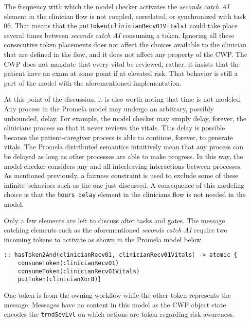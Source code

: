 The frequency with which the model checker activates the \emph{seconds catch AI} element in the clinician flow is not coupled, correlated, or synchronized with task 06. That means that the \texttt{putToken(clinicianRecv01Vitals)} could take place several times between \emph{seconds catch AI} consuming a token. Ignoring all these consecutive token placements does not affect the choices available to the clinician that are defined in the flow, and it does not affect any property of the CWP. The CWP does not mandate that every vital be reviewed, rather, it insists that the patient have an exam at some point if at elevated risk. That behavior is still a part of the model with the aforementioned implementation.

At this point of the discussion, it is also worth noting that time is not modeled. Any process in the Promela model may undergo an arbitrary, possibly unbounded, delay. For example, the model checker may simply delay, forever, the clinicians process so that it never reviews the vitals. This delay is possible because the patient-caregiver process is able to continue, forever, to generate vitals. The Promela distributed semantics intuitively mean that any process can be delayed as long as other processes are able to make progress. In this way, the model checker considers any and all interleaving interactions between processes. As mentioned previously, a fairness constraint is used to exclude some of these infinite behaviors such as the one just discussed. A consequence of this modeling choice is that the \texttt{hours delay} element in the clinicians flow is not needed in the model.

Only a few elements are left to discuss after tasks and gates. The message catching elements such as the aforementioned \textit{seconds catch AI} require two incoming tokens to activate as shown in the Promela model below.
%
{\small
\begin{lstlisting}[style=myPromela]
:: hasToken2And(clinicianRecv01, clinicianRecv01Vitals) -> atomic {
    consumeToken(clinicianRecv01)
    consumeToken(clinicianRecv01Vitals)
    putToken(clinicianXor8)}
\end{lstlisting}
}
%
\noindent One token is from the owning workflow while the other token represents the message. Messages have no content in this model as the CWP object state encodes the \texttt{trndSevLvl} on which actions are taken regarding risk awareness.

